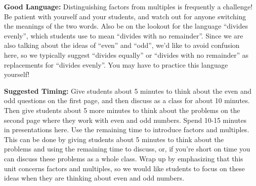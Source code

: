 \documentclass{ximera}
\begin{document}
\begin{instructorNotes}
{\bf Good Language:} Distinguishing factors from multiples is frequently a challenge! Be patient with yourself and your students, and watch out for anyone switching the meanings of the two words. Also be on the lookout for the language ``divides evenly'', which students use to mean ``divides with no remainder''. Since we are also talking about the ideas of ``even'' and ``odd'', we'd like to avoid confusion here, so we typically suggest ``divides equally'' or ``divides with no remainder'' as replacements for ``divides evenly''. You may have to practice this language yourself!



{\bf Suggested Timing:} Give students about 5 minutes to think about the even and odd questions on the first page, and then discuss as a class for about 10 minutes. Then give students about 5 more minutes to think about the  problems on the second page where they work with even and odd numbers. Spend 10-15 minutes in presentations here. Use the remaining time to introduce factors and multiples. This can be done by giving students about 5 minutes to think about the problems and using the remaining time to discuss, or, if you're short on time you can discuss these problems as a whole class. Wrap up by emphasizing that this unit concerns factors and multiples, so we would like students to focus on these ideas when they are thinking about even and odd numbers.

\end{instructorNotes}
\end{document}
